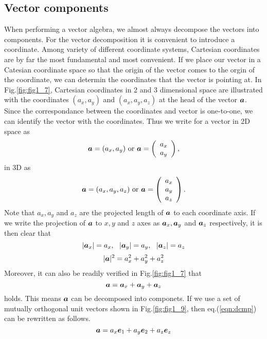 \documentclass[10pt,a4j]{article}
\begin{document}
\subsection{Vector components}
When performing a vector algebra, we almost always decompose the vectors into components. 
For the vector decomposition it is convenient to introduce a coordinate. 
Among variety of different coordinate systems, Cartesian coordinates are 
by far the most fundamental and most convenient.
If we place our vector in a Catesian coordinate space so that the origin of the 
vector comes to the orgin of the coordinate, we can determin the coordinates that 
the vector is pointing at. In Fig.\ref{fig:fig1_7}, Cartesian coordinates in 2 and 3 
dimensional space are illustrated with the coordinates $(a_x,a_y)$ and $(a_x,a_y,a_z)$
at the head of the vector $\mbox{\boldmath $a$}$.  Since the correspondance between the coordinates 
and vector is one-to-one, we can identify the vector with the coordinates.
Thus we write for a vector in 2D space as 
\[
	\mbox{\boldmath $a$}=(a_x, a_y) \ {\rm or} 
	\
	\mbox{\boldmath $a$}=\left(
	\begin{array}{c}
		a_x \\
		a_y
	\end{array}
	\right), 
\]
in 3D as 
\[
	\mbox{\boldmath $a$}=(a_x, a_y, a_z) \ {\rm or} 
	\
	\mbox{\boldmath $a$}=\left(
	\begin{array}{c}
		a_x \\
		a_y \\
		a_z
	\end{array}
	\right). 
\]
Note that $a_x, a_y$ and $a_z$ are the projected length of $\mbox{\boldmath $a$}$ to 
each coordinate axis. If we write the projection of $\mbox{\boldmath $a$}$ to $x, y$ and $z$ axes as $\mbox{\boldmath $a$}_x,\mbox{\boldmath $a$}_y$ 
and $\mbox{\boldmath $a$}_z$ respectively, it is then clear that 
\begin{equation}
	|\mbox{\boldmath $a$}_x|=a_x, \ \ |\mbox{\boldmath $a$}_y|=a_y, \ \ |\mbox{\boldmath $a$}_z|=a_z
	\label{eqn:}
\end{equation}
\begin{equation}
	|\mbox{\boldmath $a$}|^2=a_x^2+a_y^2+a_z^2
	\label{eqn:}
\end{equation}
Moreover, it can also be readily verified in Fig.\ref{fig:fig1_7} that 
\begin{equation}
	\mbox{\boldmath $a$}=\mbox{\boldmath $a$}_x+\mbox{\boldmath $a$}_y+\mbox{\boldmath $a$}_z
	\label{eqn:dcmp}
\end{equation}
holds. This means $\mbox{\boldmath $a$}$ can be decomposed into componets. 
If we use a set of mutually orthogonal unit vectors 
shown in Fig.\ref{fig:fig1_9}, then eq.(\ref{eqn:dcmp}) can be rewritten as follows.
\begin{equation}
	\mbox{\boldmath $a$}=a_x\mbox{\boldmath $e$}_1+a_y\mbox{\boldmath $e$}_2+a_z\mbox{\boldmath $e$}_z
	\label{eqn:}
\end{equation}
\end{document}
